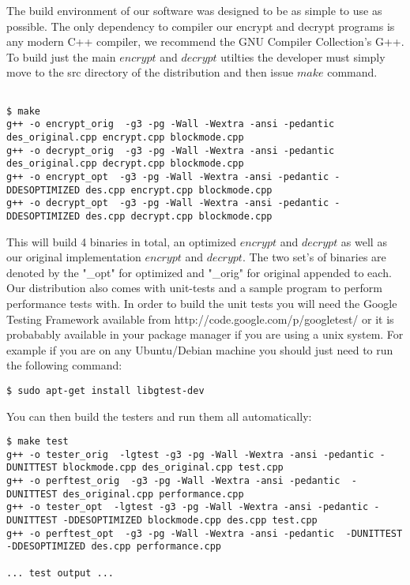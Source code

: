 \documentclass[10pt]{article}
\begin{document}
\indent  The build environment of our software was designed to be as simple to use as possible.
  The only dependency to compiler our encrypt and decrypt programs is any modern C++ compiler, we recommend the GNU Compiler Collection's G++.
  To build just the main $encrypt$ and $decrypt$ utilties the developer must simply move to the src directory of the distribution and then issue $make$ command.

{\footnotesize
\begin{verbatim}

$ make
g++ -o encrypt_orig  -g3 -pg -Wall -Wextra -ansi -pedantic des_original.cpp encrypt.cpp blockmode.cpp
g++ -o decrypt_orig  -g3 -pg -Wall -Wextra -ansi -pedantic des_original.cpp decrypt.cpp blockmode.cpp
g++ -o encrypt_opt  -g3 -pg -Wall -Wextra -ansi -pedantic -DDESOPTIMIZED des.cpp encrypt.cpp blockmode.cpp
g++ -o decrypt_opt  -g3 -pg -Wall -Wextra -ansi -pedantic -DDESOPTIMIZED des.cpp decrypt.cpp blockmode.cpp

\end{verbatim}
}
\noindent  This will build 4 binaries in total, an optimized $encrypt$ and $decrypt$ as well as our original implementation $encrypt$ and $decrypt$.
  The two set's of binaries are denoted by the "\_opt" for optimized and "\_orig" for original appended to each.
  Our distribution also comes with unit-tests and a sample program to perform performance tests with.
  In order to build the unit tests you will need the Google Testing Framework available from http://code.google.com/p/googletest/ or it is
  probabably available in your package manager if you are using a unix system. For example if you are on any Ubuntu/Debian machine you should just need to run the following command:
{\footnotesize
\begin{verbatim}
$ sudo apt-get install libgtest-dev
\end{verbatim}
}
\noindent You can then build the testers and run them all automatically:
{\footnotesize
\begin{verbatim}
$ make test
g++ -o tester_orig  -lgtest -g3 -pg -Wall -Wextra -ansi -pedantic -DUNITTEST blockmode.cpp des_original.cpp test.cpp
g++ -o perftest_orig  -g3 -pg -Wall -Wextra -ansi -pedantic  -DUNITTEST des_original.cpp performance.cpp
g++ -o tester_opt  -lgtest -g3 -pg -Wall -Wextra -ansi -pedantic -DUNITTEST -DDESOPTIMIZED blockmode.cpp des.cpp test.cpp
g++ -o perftest_opt  -g3 -pg -Wall -Wextra -ansi -pedantic  -DUNITTEST -DDESOPTIMIZED des.cpp performance.cpp

... test output ...
\end{verbatim}
}
\end{document}
